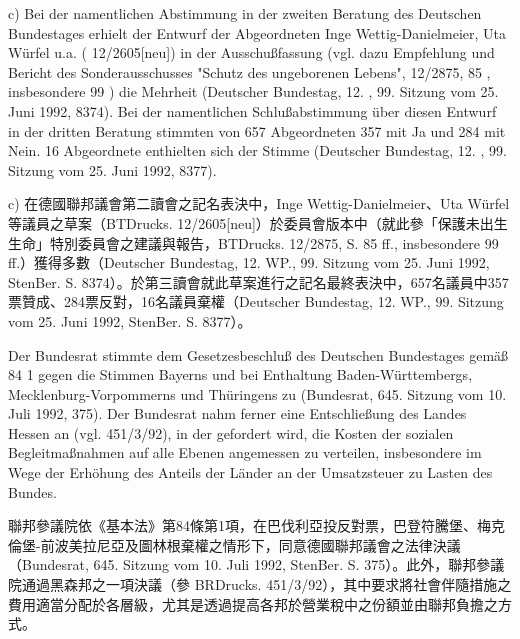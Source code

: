 \documentclass[12pt]{article}
\begin{document}
\begin{sourcepara}[title={原文理由 A.II.2.b--c} Rn 45]
c) Bei der namentlichen Abstimmung in der zweiten Beratung des Deutschen Bundestages erhielt der Entwurf der Abgeordneten Inge Wettig-Danielmeier, Uta Würfel u.a. (\abbrBTDrucks{} 12/2605[neu]) in der Ausschußfassung (vgl. dazu Empfehlung und Bericht des Sonderausschusses "Schutz des ungeborenen Lebens", \abbrBTDrucks{} 12/2875, \abbrS{} 85 \abbrFF{}, insbesondere 99 \abbrFF{}) die Mehrheit (Deutscher Bundestag, 12. \abbrWP{}, 99. Sitzung vom 25. Juni 1992, \abbrStenBer{} \abbrS{} 8374). Bei der namentlichen Schlußabstimmung über diesen Entwurf in der dritten Beratung stimmten von 657 Abgeordneten 357 mit Ja und 284 mit Nein. 16 Abgeordnete enthielten sich der Stimme (Deutscher Bundestag, 12. \abbrWP{}, 99. Sitzung vom 25. Juni 1992, \abbrStenBer{} \abbrS{} 8377).
\end{sourcepara}
\begin{transpara}
c) 在德國聯邦議會第二讀會之記名表決中，Inge Wettig-Danielmeier、Uta Würfel 等議員之草案（BTDrucks. 12/2605[neu]）於委員會版本中（就此參「保護未出生生命」特別委員會之建議與報告，BTDrucks. 12/2875, S. 85 ff., insbesondere 99 ff.）獲得多數（Deutscher Bundestag, 12. WP., 99. Sitzung vom 25. Juni 1992, StenBer. S. 8374）。於第三讀會就此草案進行之記名最終表決中，657名議員中357票贊成、284票反對，16名議員棄權（Deutscher Bundestag, 12. WP., 99. Sitzung vom 25. Juni 1992, StenBer. S. 8377）。
\end{transpara}

\begin{sourcepara}[title={原文理由 A.II.2.b--c} Rn 46]
Der Bundesrat stimmte dem Gesetzesbeschluß des Deutschen Bundestages gemäß \abbrArt{} 84 \abbrAbs{} 1 \abbrGG{}\ggfnArtEightyFourOneDE{} gegen die Stimmen Bayerns und bei Enthaltung Baden-Württembergs, Mecklenburg-Vorpommerns und Thüringens zu (Bundesrat, 645. Sitzung vom 10. Juli 1992, \abbrStenBer{} \abbrS{} 375). Der Bundesrat nahm ferner eine Entschließung des Landes Hessen an (vgl. \abbrBRDrucks{} 451/3/92), in der gefordert wird, die Kosten der sozialen Begleitmaßnahmen auf alle Ebenen angemessen zu verteilen, insbesondere im Wege der Erhöhung des Anteils der Länder an der Umsatzsteuer zu Lasten des Bundes.
\end{sourcepara}
\begin{transpara}
聯邦參議院依《基本法》第84條第1項\ggfnArtEightyFourOneZH{}，在巴伐利亞投反對票，巴登符騰堡、梅克倫堡-前波美拉尼亞及圖林根棄權之情形下，同意德國聯邦議會之法律決議（Bundesrat, 645. Sitzung vom 10. Juli 1992, StenBer. S. 375）。此外，聯邦參議院通過黑森邦之一項決議（參 BRDrucks. 451/3/92），其中要求將社會伴隨措施之費用適當分配於各層級，尤其是透過提高各邦於營業稅中之份額並由聯邦負擔之方式。
\end{transpara}
\end{document}
